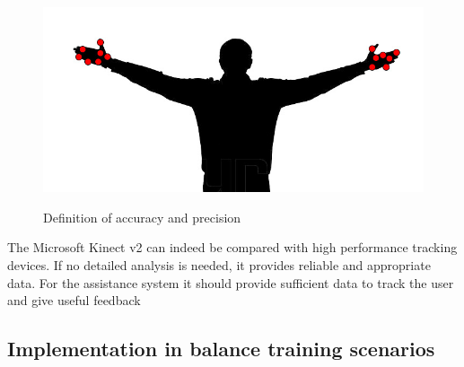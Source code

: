 \begin{figure}[htb]
\begin{minipage}[t]{0.49\linewidth}
		\label{fig:systemAccuratePrecise}
	\end{minipage}
	\hfill
	\begin{minipage}[t]{0.49\linewidth}
		\centering
		\includegraphics[width=1\linewidth]{Pictures/systemAccurateImprecise}
		\label{fig:systemAccurateImprecise}
	\end{minipage}
	\caption{Definition of accuracy and precision~\cite{Woolford2015-ub}}
	\label{fig:systemAccuracyAndPrecisiong}
\end{figure}

The Microsoft Kinect v2 can indeed be compared with high performance tracking devices. If no detailed analysis is needed, it provides reliable and appropriate data. For the assistance system it should provide sufficient data to track the user and give useful feedback

\subsection{Implementation in balance training scenarios}

